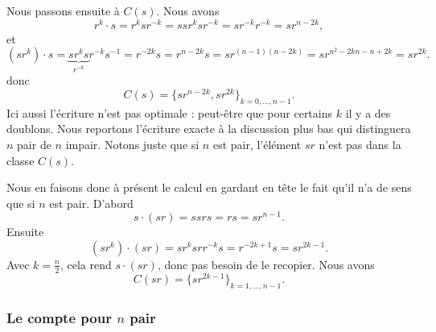 Nous passons ensuite à \( C(s)\). Nous avons
\begin{equation}
	r^k\cdot s=r^ksr^{-k}=ssr^ksr^{-k}=sr^{-k}r^{-k}=sr^{n-2k},
\end{equation}
et
\begin{equation}
	(sr^k)\cdot s=\underbrace{sr^ks}_{r^{-k}}r^{-k}s^{-1}=r^{-2k}s=r^{n-2k}s=sr^{(n-1)(n-2k)}=sr^{n^2-2kn-n+2k}=sr^{2k}.
\end{equation}
donc
\begin{equation}
	C(s)=\{ sr^{n-2k},sr^{2k} \}_{k=0,\ldots, n-1}.
\end{equation}
Ici aussi l'écriture n'est pas optimale : peut-être que pour certains \( k\) il y a des doublons. Nous reportons l'écriture exacte à la discussion plus bas qui distinguera \( n\) pair de \( n\) impair. Notons juste que si \( n\) est pair, l'élément \( sr\) n'est pas dans la classe \( C(s)\).

Nous en faisons donc à présent le calcul en gardant en tête le fait qu'il n'a de sens que si \( n\) est pair. D'abord
\begin{equation}
	s\cdot (sr)=ssrs=rs=sr^{n-1}.
\end{equation}
Ensuite
\begin{equation}
	(sr^k)\cdot (sr)=sr^ksrr^{-k}s=r^{-2k+1}s=sr^{2k-1}.
\end{equation}
Avec \( k=\frac{ n }{2}\), cela rend \( s\cdot (sr)\), donc pas besoin de le recopier. Nous avons
\begin{equation}
	C(sr)=\{ sr^{2k-1} \}_{k=1,\ldots, n-1}.
\end{equation}

\subsubsection{Le compte pour \(  n\) pair}
\label{SubsubsecROVmHuM}

